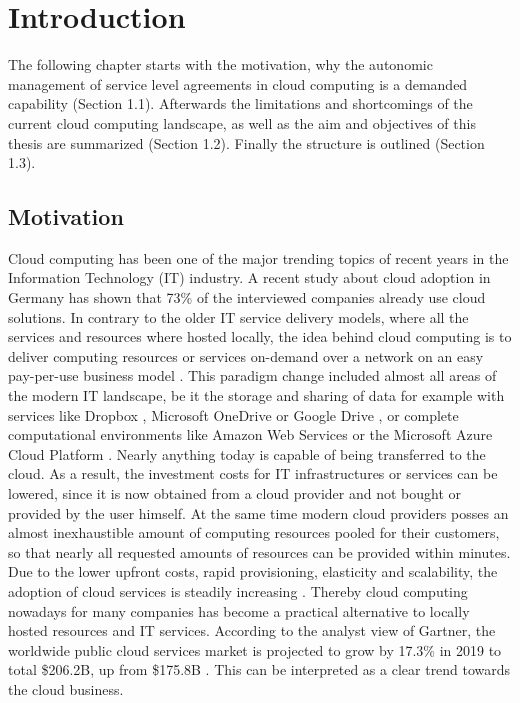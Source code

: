 
\chapter{Introduction} %
\label{Introduction} %
The following chapter starts with the motivation, why the autonomic management of service level agreements in cloud computing is a demanded capability (Section 1.1). Afterwards the limitations and shortcomings of the current cloud computing landscape, as well as the aim and objectives of this thesis are summarized (Section 1.2). Finally the structure is outlined (Section 1.3).

\section{Motivation}
Cloud computing has been one of the major trending topics of recent years in the Information Technology (IT) industry. A recent study about cloud adoption in Germany   \cite{BITKOM19} has shown that 73\% of the interviewed companies already use cloud solutions. In contrary to the older IT service delivery models, where all the services and resources where hosted locally, the idea behind cloud computing is to deliver computing resources or services on-demand over a network on an easy pay-per-use business model  \cite{NIST}. This paradigm change included almost all areas of the modern IT landscape, be it the storage and sharing of data for example with services like Dropbox  \cite{Dropbox}, Microsoft OneDrive  \cite{OneDrive} or Google Drive  \cite{GoogleDrive}, or complete computational environments like Amazon Web Services  \cite{AWS} or the Microsoft Azure Cloud Platform  \cite{Azure}. Nearly anything today is capable of being transferred to the cloud. As a result,  the investment costs for IT infrastructures or services can be lowered, since it is now obtained from a cloud provider and not bought or provided by the user himself. At the same time modern cloud providers posses an almost inexhaustible amount of computing resources pooled for their customers, so that nearly all requested amounts of resources can be provided within minutes.  Due to the lower upfront costs, rapid provisioning, elasticity and scalability, the adoption of cloud services is steadily increasing   \cite{IDC}. Thereby cloud computing nowadays for many companies has become a practical alternative to locally hosted resources and IT services. According to the analyst view of Gartner, the worldwide public cloud services market is projected to grow by 17.3\% in 2019 to total \$206.2B, up from \$175.8B   \cite{gart19}. This can be interpreted as a clear trend  towards the cloud business.

